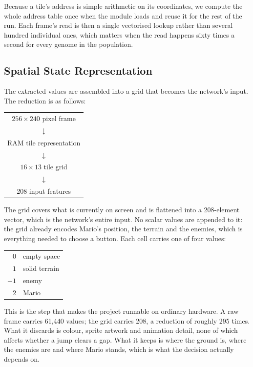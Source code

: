 \noindent
Because a tile's address is simple arithmetic on its coordinates, we compute
the whole address table once when the module loads and reuse it for the rest of
the run. Each frame's read is then a single vectorised lookup rather than
several hundred individual ones, which matters when the read happens sixty
times a second for every genome in the population.

\subsection{Spatial State Representation}
\label{subsec:quantization}

The extracted values are assembled into a grid that becomes the network's
input. The reduction is as follows:

\begin{center}
\begin{tabular}{c}
$256 \times 240$ pixel frame \\
$\downarrow$ \\
RAM tile representation \\
$\downarrow$ \\
$16 \times 13$ tile grid \\
$\downarrow$ \\
208 input features \\
\end{tabular}
\end{center}

\noindent
The grid covers what is currently on screen and is flattened into a
208-element vector, which is the network's entire input. No scalar values are
appended to it: the grid already encodes Mario's position, the terrain and the
enemies, which is everything needed to choose a button. Each cell carries one
of four values:

\begin{center}
\begin{tabular}{@{}rl@{}}
$0$  & empty space \\
$1$  & solid terrain \\
$-1$ & enemy \\
$2$  & Mario \\
\end{tabular}
\end{center}

\noindent
This is the step that makes the project runnable on ordinary hardware. A raw
frame carries 61{,}440 values; the grid carries 208, a reduction of roughly 295
times. What it discards is colour, sprite artwork and animation detail, none of
which affects whether a jump clears a gap. What it keeps is where the ground
is, where the enemies are and where Mario stands, which is what the decision
actually depends on.

